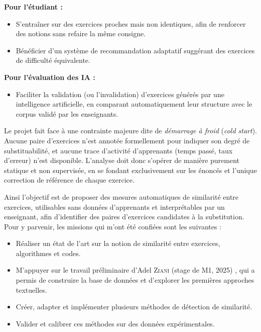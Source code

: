 \documentclass[12pt,a4paper,oneside]{report}
\begin{document}
\textbf{Pour l'étudiant :}
\begin{itemize}
    \item S'entraîner sur des exercices proches mais non identiques, afin de renforcer des notions sans refaire la même consigne.
    \item Bénéficier d'un système de recommandation adaptatif suggérant des exercices de difficulté équivalente.
\end{itemize}
\vspace{0.4cm}

\textbf{Pour l'évaluation des IA :}
\begin{itemize}
    \item Faciliter la validation (ou l'invalidation) d'exercices générés par une intelligence artificielle, en comparant automatiquement leur structure avec le corpus validé par les enseignants.
\end{itemize}

\vspace{0.8cm}

Le projet fait face à une contrainte majeure dite de \emph{démarrage à froid} (\emph{cold start}). Aucune paire d'exercices n'est annotée formellement pour indiquer son degré de substituabilité, et aucune trace d'activité d'apprenants (temps passé, taux d'erreur) n'est disponible. L'analyse doit donc s'opérer de manière purement statique et non supervisée, en se fondant exclusivement sur les énoncés et l'unique correction de référence de chaque exercice.
\vspace{0.6cm}

Ainsi  l'objectif  est de proposer des mesures automatiques de
similarité entre exercices, utilisables sans données d'apprenants et
interprétables par un enseignant, afin d'identifier des paires
d'exercices candidates à la substitution.
Pour y parvenir, les missions
qui m'ont été confiées sont les suivantes :
\begin{itemize}
    \item Réaliser un état de l'art sur la notion de similarité entre exercices,
     algorithmes et codes.
    \item M'appuyer sur le travail préliminaire d'Adel \textsc{Ziani} (stage de M1, 2025) \cite{ziani_detection_2025}, qui a permis de construire la base de données et d'explorer les premières approches textuelles.
    \item Créer, adapter et implémenter plusieurs méthodes de détection de similarité.
    \item Valider et calibrer ces méthodes sur des données expérimentales.
\end{itemize}
\end{document}
